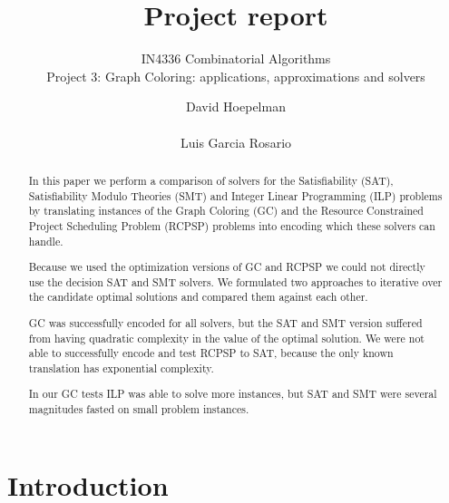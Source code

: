 \documentclass{sig-alternate}
\begin{document}
\title{Project report}

\subtitle{IN4336 Combinatorial Algorithms\\Project 3: Graph Coloring: applications, approximations and
solvers}


\author{
\alignauthor
David Hoepelman\\
       \\
\alignauthor
Luis Garcia Rosario\\
}

\maketitle


\begin{abstract}

In this paper we perform a comparison of solvers for the Satisfiability (SAT), Satisfiability Modulo Theories (SMT) and Integer Linear Programming (ILP) problems by translating instances of the Graph Coloring (GC) and the Resource Constrained Project Scheduling Problem (RCPSP) problems into encoding which these solvers can handle.

Because we used the optimization versions of GC and RCPSP we could not directly use the decision SAT and SMT solvers.
We formulated two approaches to iterative over the candidate optimal solutions and compared them against each other.

GC was successfully encoded for all solvers, but the SAT and SMT version suffered from having quadratic complexity in the value of the optimal solution.
We were not able to successfully encode and test RCPSP to SAT, because the only known translation has exponential complexity.

In our GC tests ILP was able to solve more instances, but SAT and SMT were several magnitudes fasted on small problem instances.

\end{abstract}


\section{Introduction}
\end{document}
